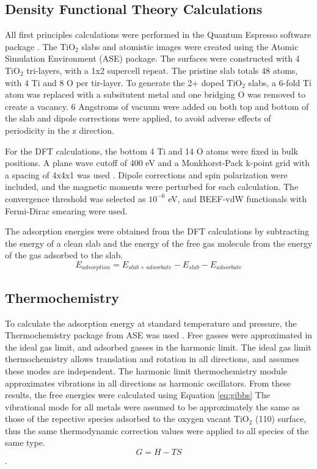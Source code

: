 \subsection{Density Functional Theory Calculations}
All first principles calculations were performed in the Quantum Espresso software package \cite{QE-2009}.
The TiO$_2$ slabs and atomistic images were created using the Atomic Simulation Environment (ASE) package\cite{Hjorth_Larsen_2017}. The surfaces were constructed with 4 TiO$_2$ tri-layers, with a 1x2 supercell repeat. The pristine slab totals 48 atoms, with 4 Ti and 8 O per tir-layer. To generate the 2+ doped TiO$_2$ slabs, a 6-fold Ti atom was replaced with a subsitutent metal and one bridging O was removed to create a vacancy. 6 Angstroms of vacuum were added on both top and bottom of the slab and dipole corrections were applied, to avoid adverse effects of periodicity in the z direction.

For the DFT calculations, the bottom 4 Ti and 14 O atoms were fixed in bulk positions. A plane wave cutoff of 400 eV and a Monkhorst-Pack k-point grid with a spacing of 4x4x1 was used \cite{Monkhorst_1976}. Dipole corrections and spin polarization were included, and the magnetic moments were perturbed for each calculation. The convergence threshold was selected as $10^{-6}$ eV, and BEEF-vdW functionals \cite{Wellendorff_2012} with Fermi-Dirac smearing were used.

The adsorption energies were obtained from the DFT calculations by subtracting the energy of a clean slab and the energy of the free gas molecule from the energy of the gas adsorbed to the slab.
\begin{equation}
E_{adsorption} = E_{slab+adsorbate} - E_{slab} - E_{adsorbate}
\end{equation}

\subsection{Thermochemistry}
\cite{ase-paper,Reuter_2005}

To calculate the adsorption energy at standard temperature and pressure, the Thermochemistry package from ASE was used \cite{ase-paper}. Free gasses were approximated in the ideal gas limit, and adsorbed gasses in the harmonic limit. The ideal gas limit thermochemistry allows translation and rotation in all directions, and assumes these modes are independent. The harmonic limit thermochemistry module approximates vibrations in all directions as harmonic oscillators. From these results, the free energies were calculated using Equation \ref{eq:gibbs} The vibrational mode for all metals were assumed to be approximately the same as those of the repective species adsorbed to the oxygen vacant TiO$_2$ (110) surface, thus the same thermodynamic correction values were applied to all species of the same type.
\begin{equation}
    G=H-TS
    \label{eq:gibbs}
\end{equation}. 

